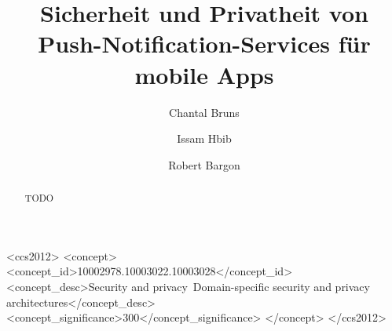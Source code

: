 \documentclass[sigconf]{acmart}
\begin{document}
\title{Sicherheit und Privatheit von Push-Notification-Services für mobile Apps}

\author{Chantal Bruns}

\author{Issam Hbib}

\author{Robert Bargon}

\renewcommand{\shortauthors}{Bruns, Hbib, Bargon}

\begin{abstract}
  TODO
\end{abstract}

\begin{CCSXML}
<ccs2012>
  <concept>
  <concept_id>10002978.10003022.10003028</concept_id>
  <concept_desc>Security and privacy~Domain-specific security and privacy architectures</concept_desc>
  <concept_significance>300</concept_significance>
  </concept>
</ccs2012>
\end{CCSXML}



\maketitle
\end{document}
